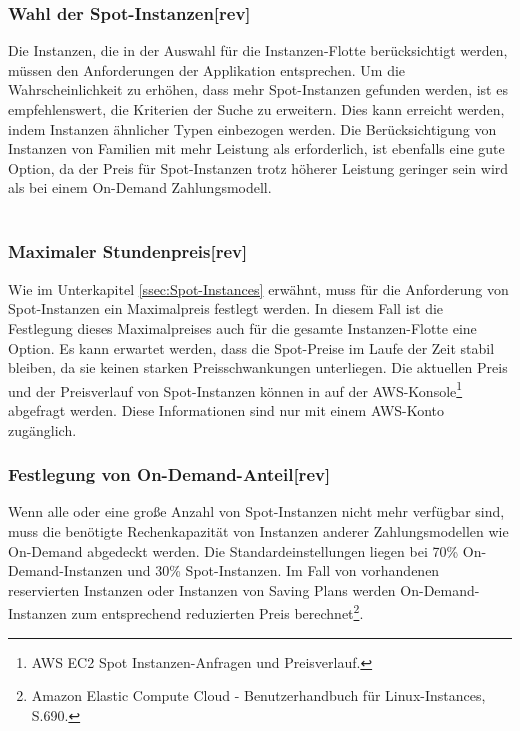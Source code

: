 \subsubsection*{Wahl der Spot-Instanzen[rev]}
Die Instanzen, die in der Auswahl für die Instanzen-Flotte berücksichtigt werden, müssen den Anforderungen der Applikation entsprechen. Um die Wahrscheinlichkeit zu erhöhen, dass mehr Spot-Instanzen gefunden werden, ist es empfehlenswert, die Kriterien der Suche zu erweitern. Dies kann erreicht werden, indem Instanzen ähnlicher Typen einbezogen werden. Die Berücksichtigung von Instanzen von Familien mit mehr Leistung als erforderlich, ist ebenfalls eine gute Option\cite{AMZ24}, da der Preis für Spot-Instanzen trotz höherer Leistung geringer sein wird als bei einem On-Demand Zahlungsmodell.
\\\\
\subsubsection*{Maximaler Stundenpreis[rev]}
Wie im Unterkapitel \ref{ssec:Spot-Instances} erwähnt, muss für die Anforderung von Spot-Instanzen ein Maximalpreis festlegt werden. In diesem Fall ist die Festlegung dieses Maximalpreises auch für die gesamte Instanzen-Flotte eine Option. Es kann erwartet werden, dass die Spot-Preise im Laufe der Zeit stabil bleiben, da sie keinen starken Preisschwankungen unterliegen. Die aktuellen Preis und der Preisverlauf von Spot-Instanzen können in auf der AWS-Konsole\footnote{AWS EC2 Spot Instanzen-Anfragen und Preisverlauf\cite{AMZ25}.} abgefragt werden. Diese Informationen sind nur mit einem AWS-Konto zugänglich.
\\
\subsubsection*{Festlegung von On-Demand-Anteil[rev]}
Wenn alle oder eine große Anzahl von Spot-Instanzen nicht mehr verfügbar sind, muss die benötigte Rechenkapazität von Instanzen anderer Zahlungsmodellen wie On-Demand abgedeckt werden. Die Standardeinstellungen liegen bei 70\% On-Demand-Instanzen und 30\% Spot-Instanzen\cite{AMZ24}. Im Fall von vorhandenen reservierten Instanzen oder Instanzen von Saving Plans werden On-Demand-Instanzen zum entsprechend reduzierten Preis berechnet\footnote{Amazon Elastic Compute Cloud - Benutzerhandbuch für Linux-Instances, S.690\cite{AMZ26}.}.

